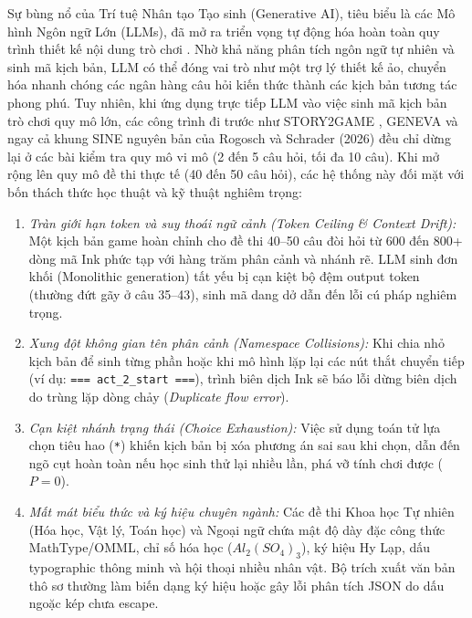 \documentclass[conference]{IEEEtran}
\begin{document}
Sự bùng nổ của Trí tuệ Nhân tạo Tạo sinh (Generative AI), tiêu biểu là các Mô hình Ngôn ngữ Lớn (LLMs), đã mở ra triển vọng tự động hóa hoàn toàn quy trình thiết kế nội dung trò chơi \cite{gallotta2024}. Nhờ khả năng phân tích ngôn ngữ tự nhiên và sinh mã kịch bản, LLM có thể đóng vai trò như một trợ lý thiết kế ảo, chuyển hóa nhanh chóng các ngân hàng câu hỏi kiến thức thành các kịch bản tương tác phong phú. Tuy nhiên, khi ứng dụng trực tiếp LLM vào việc sinh mã kịch bản trò chơi quy mô lớn, các công trình đi trước như STORY2GAME \cite{zhou2025}, GENEVA \cite{leandro2024} và ngay cả khung SINE nguyên bản của Rogosch và Schrader (2026) \cite{rogosch2026} đều chỉ dừng lại ở các bài kiểm tra quy mô vi mô (2 đến 5 câu hỏi, tối đa 10 câu). Khi mở rộng lên quy mô đề thi thực tế (40 đến 50 câu hỏi), các hệ thống này đối mặt với bốn thách thức học thuật và kỹ thuật nghiêm trọng:
\begin{enumerate}
    \item \textit{Tràn giới hạn token và suy thoái ngữ cảnh (Token Ceiling \& Context Drift):} Một kịch bản game hoàn chỉnh cho đề thi 40--50 câu đòi hỏi từ 600 đến 800+ dòng mã Ink phức tạp với hàng trăm phân cảnh và nhánh rẽ. LLM sinh đơn khối (Monolithic generation) tất yếu bị cạn kiệt bộ đệm output token (thường đứt gãy ở câu 35--43), sinh mã dang dở dẫn đến lỗi cú pháp nghiêm trọng.
    \item \textit{Xung đột không gian tên phân cảnh (Namespace Collisions):} Khi chia nhỏ kịch bản để sinh từng phần hoặc khi mô hình lặp lại các nút thắt chuyển tiếp (ví dụ: \texttt{=== act\_2\_start ===}), trình biên dịch Ink sẽ báo lỗi dừng biên dịch do trùng lặp dòng chảy (\textit{Duplicate flow error}).
    \item \textit{Cạn kiệt nhánh trạng thái (Choice Exhaustion):} Việc sử dụng toán tử lựa chọn tiêu hao (\texttt{*}) khiến kịch bản bị xóa phương án sai sau khi chọn, dẫn đến ngõ cụt hoàn toàn nếu học sinh thử lại nhiều lần, phá vỡ tính chơi được ($P = 0$).
    \item \textit{Mất mát biểu thức và ký hiệu chuyên ngành:} Các đề thi Khoa học Tự nhiên (Hóa học, Vật lý, Toán học) và Ngoại ngữ chứa mật độ dày đặc công thức MathType/OMML, chỉ số hóa học ($Al_2(SO_4)_3$), ký hiệu Hy Lạp, dấu typographic thông minh và hội thoại nhiều nhân vật. Bộ trích xuất văn bản thô sơ thường làm biến dạng ký hiệu hoặc gây lỗi phân tích JSON do dấu ngoặc kép chưa escape.
\end{enumerate}
\end{document}
